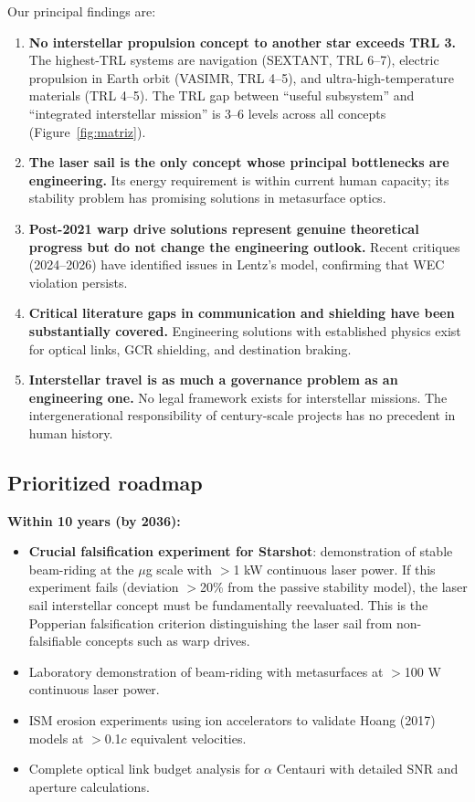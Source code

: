 \documentclass[11pt,a4paper,onecolumn]{article}
\begin{document}
Our principal findings are:

\begin{enumerate}
  \item \textbf{No interstellar propulsion concept to another star exceeds TRL 3.} The highest-TRL systems are navigation (SEXTANT, TRL 6--7), electric propulsion in Earth orbit (VASIMR, TRL 4--5), and ultra-high-temperature materials (TRL 4--5). The TRL gap between ``useful subsystem'' and ``integrated interstellar mission'' is 3--6 levels across all concepts (Figure~\ref{fig:matriz}).
  \item \textbf{The laser sail is the only concept whose principal bottlenecks are engineering.} Its energy requirement is within current human capacity; its stability problem has promising solutions in metasurface optics.
  \item \textbf{Post-2021 warp drive solutions represent genuine theoretical progress but do not change the engineering outlook.} Recent critiques (2024--2026) have identified issues in Lentz's model, confirming that WEC violation persists.
  \item \textbf{Critical literature gaps in communication and shielding have been substantially covered.} Engineering solutions with established physics exist for optical links, GCR shielding, and destination braking.
  \item \textbf{Interstellar travel is as much a governance problem as an engineering one.} No legal framework exists for interstellar missions. The intergenerational responsibility of century-scale projects has no precedent in human history.
\end{enumerate}

\subsection{Prioritized roadmap}

\textbf{Within 10 years (by 2036):}
\begin{itemize}
  \item \textbf{Crucial falsification experiment for Starshot}: demonstration of stable beam-riding at the $\mu$g scale with $>$1 kW continuous laser power. If this experiment fails (deviation $>$20\% from the passive stability model), the laser sail interstellar concept must be fundamentally reevaluated. This is the Popperian falsification criterion distinguishing the laser sail from non-falsifiable concepts such as warp drives.
  \item Laboratory demonstration of beam-riding with metasurfaces at $>$100 W continuous laser power.
  \item ISM erosion experiments using ion accelerators to validate Hoang (2017) models at $>$0.1$c$ equivalent velocities.
  \item Complete optical link budget analysis for $\alpha$ Centauri with detailed SNR and aperture calculations.
\end{itemize}
\end{document}
